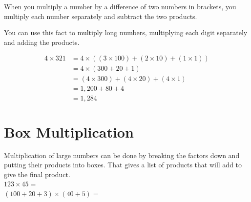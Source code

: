\documentclass[12pt]{article}
\begin{document}
\begin{enumerate}
When you multiply a number by a difference of two numbers in brackets, you multiply each number separately and subtract the two products.

\begin{center}
\end{center}

You can use this fact to multiply long numbers, multiplying each digit separately and adding the products.
\begin{center}
\begin{align*}
4\times 321 &= 4 \times ((3 \times 100) + (2 \times 10) + (1 \times 1))\\
&= 4 \times (300 + 20 + 1)\\
&= (4\times300)+(4\times20)+(4\times1)\\
&= 1,200+80+4\\
&=1,284
\end{align*}
\end{center}

\newpage

\section*{Box Multiplication}
Multiplication of large numbers can be done by breaking the factors down and putting their products into boxes. That gives a list of products that will add to give the final product.\\

\noindent
$123 \times 45 =$\\

$(100 + 20 + 3) \times (40 + 5) =$\\


\end{enumerate}
\end{document}
